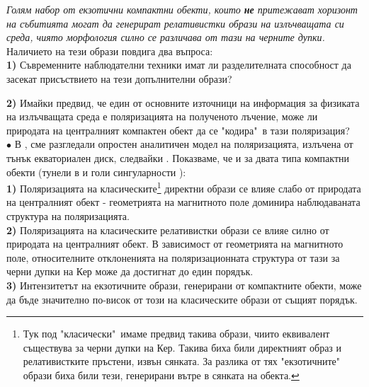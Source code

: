 \emph{Голям набор от екзотични компактни обекти, които \textbf{не} притежават хоризонт на събитията могат да генерират релативистки образи на излъчващата си среда, чиято морфология силно се различава от тази на черните дупки.}\\

\noindent Наличието на тези образи повдига два въпроса:\\

\noindent\textbf{1)} Съвременните наблюдателни техники имат ли разделителната способност да засекат присъствието на тези допълнителни образи?\newline

\noindent\textbf{2)} Имайки предвид, че един от основните източници на информация за физиката на излъчващата среда е поляризацията на полученото лъчение, може ли природата на централният компактен обект да се "кодира"$\,$ в тази поляризация?\\\newline
$\bullet$ В \cite{Delijski2022}, \cite{Deliyski2023} сме разгледали опростен аналитичен модел на поляризацията, излъчена от тънък екваториален диск, следвайки \cite{Narayan2021}. Показваме, че и за двата типа компактни обекти (тунели в \cite{Delijski2022} и голи сингуларности \cite{Deliyski2023}):\\\newline
\textbf{1)} Поляризацията на класическите\footnote{Тук под "класически"$\,$ имаме предвид такива образи, чиито еквивалент съществува за черни дупки на Кер. Такива биха били директният образ и релативистките пръстени, извън сянката. За разлика от тях "екзотичните"$\,$ образи биха били тези, генерирани вътре в сянката на обекта.} директни образи се влияе слабо от природата на централният обект - геометрията на магнитното поле доминира наблюдаваната структура на поляризацията.\\\newline
\textbf{2)} Поляризацията на класическите релативистки образи се влияе силно от природата на централният обект. В зависимост от геометрията на магнитното поле, относителните отклоненията на поляризационната структура от тази за черни дупки на Кер може да достигнат 
до един порядък.\\\newline
\textbf{3)} Интензитетът на екзотичните образи, генерирани от компактните обекти, може да бъде значително по-висок от този на класическите образи от същият порядък.\\

